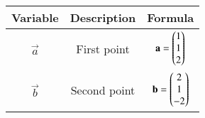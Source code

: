 \begin{center}
    \begin{tabular}{|c|c|c|} 
        \hline
            \textbf{Variable} & \textbf{Description} & \textbf{Formula} \\ 
        \hline
            $\vec{a}$   & First point & $\mathbf{a} = \begin{pmatrix}1\\1\\2\end{pmatrix}$ \\ 
        \hline
            $\vec{b}$   & Second point &  $\mathbf{b} = \begin{pmatrix}2\\1\\-2\end{pmatrix}$\\ 
        \hline
    \end{tabular}
\end{center}
